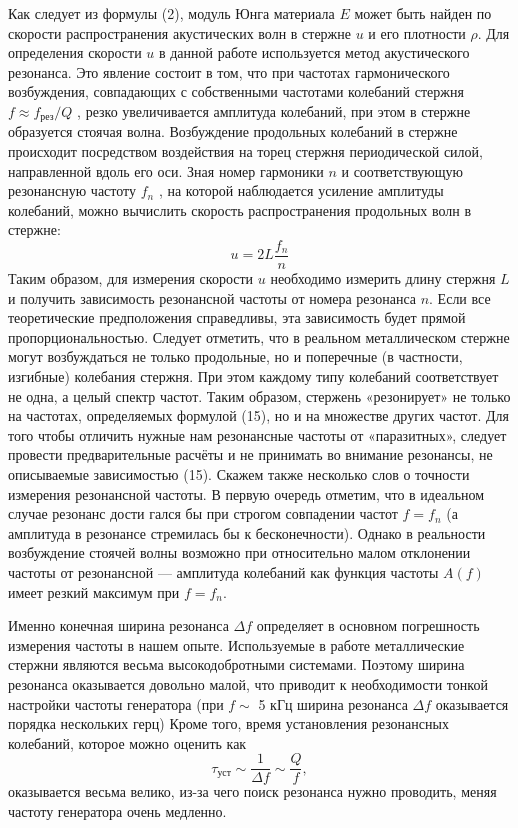 \documentclass[a4paper, 10pt, twocolumn]{article}
\begin{document}
\par Как следует из формулы (2), модуль Юнга материала $E$ может быть
найден по скорости распространения акустических волн в стержне $u$ и его
плотности $\rho$. Для определения скорости $u$ в данной работе используется
метод акустического резонанса. Это явление состоит в том, что при частотах гармонического возбуждения, совпадающих с собственными частотами
колебаний стержня $f \approx f_\text{рез}/Q$ , резко увеличивается амплитуда колебаний, при
этом в стержне образуется стоячая волна.
Возбуждение продольных колебаний в стержне происходит посредством воздействия на торец стержня периодической силой, направленной
вдоль его оси. Зная номер гармоники $n$ и соответствующую резонансную
частоту $f_n$ , на которой наблюдается усиление амплитуды колебаний,
можно вычислить скорость распространения продольных волн в стержне:
\begin{equation}
    u = 2L\frac{f_n}{n}
\end{equation}
Таким образом, для измерения скорости $u$ необходимо измерить длину
стержня $L$ и получить зависимость резонансной частоты от номера резонанса
$n$. Если все теоретические предположения справедливы, эта зависимость
будет прямой пропорциональностью.
Следует отметить, что в реальном металлическом стержне могут возбуждаться
 не только продольные, но и поперечные (в частности, изгибные)
колебания стержня. При этом каждому типу колебаний соответствует не
одна, а целый спектр частот. Таким образом, стержень «резонирует» не
только на частотах, определяемых формулой (15), но и на множестве других
 частот. Для того чтобы отличить нужные нам резонансные частоты от
«паразитных», следует провести предварительные расчёты и не принимать
во внимание резонансы, не описываемые зависимостью (15).
Скажем также несколько слов о точности измерения резонансной частоты. 
В первую очередь отметим, что в идеальном случае резонанс дости
гался бы при строгом совпадении частот $f = f_n$ (а амплитуда в резонансе
стремилась бы к бесконечности). Однако в реальности возбуждение стоячей
 волны возможно при относительно малом отклонении частоты от
 резонансной — амплитуда колебаний как функция частоты $A(f)$ имеет резкий
максимум при $f = f_n$.
\par Именно конечная ширина резонанса $\Delta f$ определяет в основном погрешность измерения частоты в нашем опыте.
Используемые в работе металлические стержни являются весьма высокодобротными
 системами. Поэтому ширина резонанса оказывается довольно малой, что приводит
 к необходимости тонкой настройки частоты генератора (при $f\sim$
 5 кГц ширина резонанса $\Delta f$ оказывается порядка нескольких герц)
Кроме того, время установления резонансных колебаний, которое можно
оценить как
\begin{equation}
    \tau_\text{уст} \sim \frac{1}{\Delta f} \sim \frac{Q}{f},
\end{equation}
оказывается весьма велико, из-за чего поиск резонанса нужно проводить, меняя частоту
генератора очень медленно.
\end{document}
